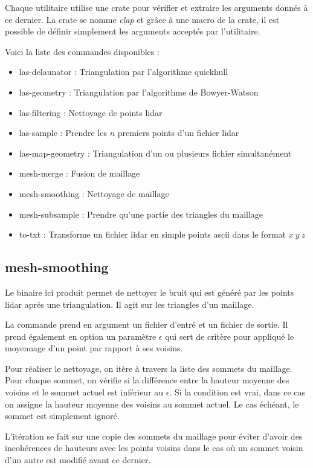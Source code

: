 Chaque utilitaire utilise une crate pour vérifier et extraire les arguments
donnés à ce dernier. La crate se nomme \textit{clap} et grâce à une macro de la
crate, il est possible de définir simplement les arguments acceptés par 
l'utilitaire.

Voici la liste des commandes disponibles :
\begin{itemize}
	\item las-delaunator : Triangulation par l'algorithme quickhull
	\item las-geometry : Triangulation par l'algorithme de Bowyer-Watson
	\item las-filtering : Nettoyage de points lidar
	\item las-sample : Prendre les $n$ premiers points d'un fichier lidar
	\item las-map-geometry : Triangulation d'un ou plusieurs fichier
		simultanément
	\item mesh-merge : Fusion de maillage
	\item mesh-smoothing : Nettoyage de maillage
	\item mesh-subsample : Prendre qu'une partie des triangles du maillage
	\item to-txt : Transforme un fichier lidar en simple points ascii dans le
		format $x\ y\ z$
\end{itemize}

\subsection{mesh-smoothing}

Le binaire ici produit permet de nettoyer le bruit qui est généré par les points
lidar aprés une triangulation. Il agit sur les triangles d'un maillage.

La commande prend en argument un fichier d'entré et un fichier de sortie. Il
prend également en option un paramètre $\epsilon$ qui sert de critère pour
appliqué le moyennage d'un point par rapport à ses voisins.

Pour réaliser le nettoyage, on itère à travers la liste des sommets du maillage.
Pour chaque sommet, on vérifie si la différence entre la hauteur moyenne des voisins
et le sommet actuel est inférieur au $\epsilon$.
Si la condition est vrai, dans ce cas on assigne la hauteur moyenne des voisins
au sommet actuel. Le cas échéant, le sommet est simplement ignoré.

L'itération se fait sur une copie des sommets du maillage pour éviter d'avoir
des incohérences de hauteurs avec les points voisins dans le cas où un sommet
voisin d'un autre est modifié avant ce dernier.

